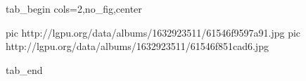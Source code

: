  
 
 
 
 

\ifcmt
  tab_begin cols=2,no_fig,center

     pic http://lgpu.org/data/albums/1632923511/61546f9597a91.jpg
		 pic http://lgpu.org/data/albums/1632923511/61546f851cad6.jpg

  tab_end
\fi
